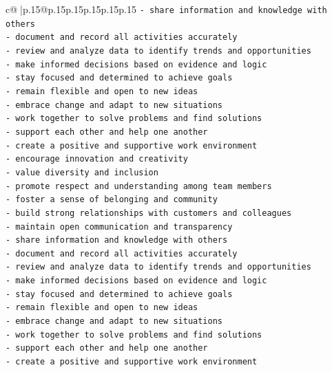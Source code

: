 \documentclass{article}
\begin{document}
{\begin{supertabular}{c@{$\;$}|p{.15\linewidth}@{}p{.15\linewidth}p{.15\linewidth}p{.15\linewidth}p{.15\linewidth}p{.15\linewidth}}
{{{\texttt{{-} share information and knowledge with others} \\
\texttt{{-} document and record all activities accurately} \\
\texttt{{-} review and analyze data to identify trends and opportunities} \\
\texttt{{-} make informed decisions based on evidence and logic} \\
\texttt{{-} stay focused and determined to achieve goals} \\
\texttt{{-} remain flexible and open to new ideas} \\
\texttt{{-} embrace change and adapt to new situations} \\
\texttt{{-} work together to solve problems and find solutions} \\
\texttt{{-} support each other and help one another} \\
\texttt{{-} create a positive and supportive work environment} \\
\texttt{{-} encourage innovation and creativity} \\
\texttt{{-} value diversity and inclusion} \\
\texttt{{-} promote respect and understanding among team members} \\
\texttt{{-} foster a sense of belonging and community} \\
\texttt{{-} build strong relationships with customers and colleagues} \\
\texttt{{-} maintain open communication and transparency} \\
\texttt{{-} share information and knowledge with others} \\
\texttt{{-} document and record all activities accurately} \\
\texttt{{-} review and analyze data to identify trends and opportunities} \\
\texttt{{-} make informed decisions based on evidence and logic} \\
\texttt{{-} stay focused and determined to achieve goals} \\
\texttt{{-} remain flexible and open to new ideas} \\
\texttt{{-} embrace change and adapt to new situations} \\
\texttt{{-} work together to solve problems and find solutions} \\
\texttt{{-} support each other and help one another} \\
\texttt{{-} create a positive and supportive work environment} \\
}}}
\end{supertabular}}
\end{document}
